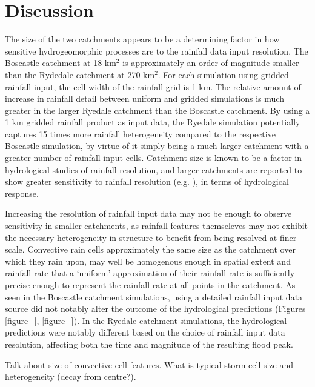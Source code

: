 \section{Discussion}
The size of the two catchments appears to be a determining factor in how sensitive hydrogeomorphic processes are to the rainfall data input resolution. The Boscastle catchment at 18 km\(^2\) is approximately an order of magnitude smaller than the Rydedale catchment at 270 km\(^2\). For each simulation using gridded rainfall input, the cell width of the rainfall grid is 1 km. The relative amount of increase in rainfall detail between uniform and gridded simulations is much greater in the larger Ryedale catchment than the Boscastle catchment. By using a 1 km gridded rainfall product as input data, the Ryedale simulation potentially captures 15 times more rainfall heterogeneity compared to the respective Boscastle simulation, by virtue of it simply being a much larger catchment with a greater number of rainfall input cells. Catchment size is known to be a factor in hydrological studies of rainfall resolution, and larger catchments are reported to show greater sensitivity to rainfall resolution (e.g. \citep{nicotina2006}), in terms of hydrological response. 

Increasing the resolution of rainfall input data may not be enough to observe sensitivity in smaller catchments, as rainfall features themseleves may not exhibit the necessary heterogeneity in structure to benefit from being resolved at finer scale. Convective rain cells approximately the same size as the catchment over which they rain upon, may well be homogenous enough in spatial extent and rainfall rate that a `uniform' approximation of their rainfall rate is sufficiently precise enough to represent the rainfall rate at all points in the catchment. As seen in the Boscastle catchment simulations, using a detailed rainfall input data source did not notably alter the outcome of the hydrological predictions (Figures \ref{figure_}, \ref{figure_}). In the Ryedale catchment simulations, the hydrological predictions were notably different based on the choice of rainfall input data resolution, affecting both the time and magnitude of the resulting flood peak. 

Talk about size of convective cell features. What is typical storm cell size and heterogeneity (decay from centre?).

